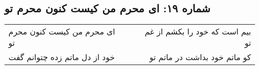 \begin{center}
\section*{شماره ۱۹: ای محرم من کیست کنون محرم تو}
\label{sec:019}
\begin{longtable}{l p{0.5cm} r}
ای محرم من کیست کنون محرم تو
&&
بیم است که خود را بکشم از غم تو
\\
خود از دل ماتم زده چتوانم گفت
&&
کو ماتم خود بداشت در ماتم تو
\\
\end{longtable}
\end{center}

